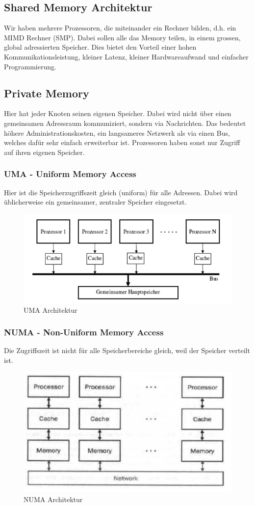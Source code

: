 \subsection{Shared Memory Architektur}
Wir haben mehrere Prozessoren, die miteinander ein Rechner bilden, d.h. ein MIMD Rechner (SMP). Dabei sollen alle das Memory teilen, in einem grossen, global adressierten Speicher. Dies bietet den Vorteil einer hohen Kommunikationsleistung, kleiner Latenz, kleiner Hardwareaufwand und einfacher Programmierung.

\subsection{Private Memory}
Hier hat jeder Knoten seinen eigenen Speicher. Dabei wird nicht über einen gemeinsamen Adressraum kommuniziert, sondern via Nachrichten. Das bedeutet höhere Administrationskosten, ein langsameres Netzwerk als via einen Bus, welches dafür sehr einfach erweiterbar ist.
Prozessoren haben sonst nur Zugriff auf ihren eigenen Speicher.

\subsubsection{UMA - Uniform Memory Access}
Hier ist die Speicherzugriffszeit gleich (uniform) für alle Adressen. Dabei wird üblicherweise ein gemeinsamer, zentraler Speicher eingesetzt.
\begin{figure}[h!]
\centering
\includegraphics[width=0.5\linewidth]{fig/uma}
\caption{UMA Architektur}
\label{fig:uma}
\end{figure}

\subsubsection{NUMA - Non-Uniform Memory Access}
Die Zugriffszeit ist nicht für alle Speicherbereiche gleich, weil der Speicher verteilt ist.
\begin{figure}[h!]
\centering
\includegraphics[width=0.5\linewidth]{fig/numa}
\caption{NUMA Architektur}
\label{fig:numa}
\end{figure}

